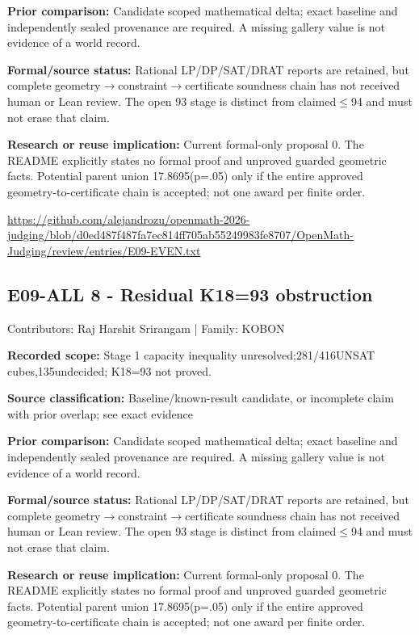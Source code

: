 \documentclass[11pt,a4paper]{article}
\begin{document}
\textbf{Prior comparison:} Candidate scoped mathematical delta; exact baseline and independently sealed provenance are required. A missing gallery value is not evidence of a world record.

\textbf{Formal/source status:} Rational LP/DP/SAT/DRAT reports are retained, but complete geometry\ensuremath{\to}constraint\ensuremath{\to}certificate soundness chain has not received human or Lean review. The open 93 stage is distinct from claimed\ensuremath{\leq}94 and must not erase that claim.

\textbf{Research or reuse implication:} Current formal-only proposal 0. The README explicitly states no formal proof and unproved guarded geometric facts. Potential parent union 17.8695(p=.05) only if the entire approved geometry-to-certificate chain is accepted; not one award per finite order.

{\small \url{https://github.com/alejandrozu/openmath-2026-judging/blob/d0ed487f487fa7ec814ff705ab55249983fe8707/OpenMath-Judging/review/entries/E09-EVEN.txt}\par}

\begin{samepage}
\subsection{E09-ALL 8  -  Residual K18=93 obstruction}
{\small Contributors: Raj Harshit Srirangam | Family: KOBON\par}

\textbf{Recorded scope:} Stage 1 capacity inequality unresolved;281/416UNSAT cubes,135undecided; K18=93 not proved.

\end{samepage}
\textbf{Source classification:} Baseline/known-result candidate, or incomplete claim with prior overlap; see exact evidence

\textbf{Prior comparison:} Candidate scoped mathematical delta; exact baseline and independently sealed provenance are required. A missing gallery value is not evidence of a world record.

\textbf{Formal/source status:} Rational LP/DP/SAT/DRAT reports are retained, but complete geometry\ensuremath{\to}constraint\ensuremath{\to}certificate soundness chain has not received human or Lean review. The open 93 stage is distinct from claimed\ensuremath{\leq}94 and must not erase that claim.

\textbf{Research or reuse implication:} Current formal-only proposal 0. The README explicitly states no formal proof and unproved guarded geometric facts. Potential parent union 17.8695(p=.05) only if the entire approved geometry-to-certificate chain is accepted; not one award per finite order.
\end{document}
